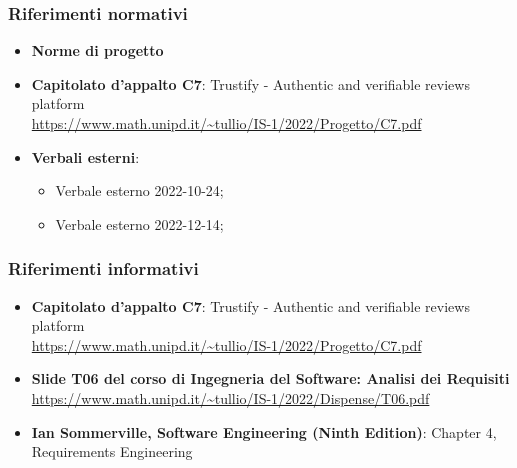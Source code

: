\subsubsection{Riferimenti normativi}
\begin{itemize}
    \item \textbf{Norme di progetto}
    \item \textbf{Capitolato d'appalto C7}: Trustify - Authentic and verifiable reviews platform \\
          \url{https://www.math.unipd.it/~tullio/IS-1/2022/Progetto/C7.pdf}
          \hfill{}
    \item \textbf{Verbali esterni}:
          \begin{itemize}
              \item Verbale esterno 2022-10-24;
              \item Verbale esterno 2022-12-14;
          \end{itemize}
\end{itemize}
\subsubsection{Riferimenti informativi}
\begin{itemize}
    \item \textbf{Capitolato d'appalto C7}: Trustify - Authentic and verifiable reviews platform \\
          \url{https://www.math.unipd.it/~tullio/IS-1/2022/Progetto/C7.pdf}
          \hfill{}
    \item \textbf{Slide T06 del corso di Ingegneria del Software: Analisi dei Requisiti} \\
          \url{https://www.math.unipd.it/~tullio/IS-1/2022/Dispense/T06.pdf}
          \hfill{}
    \item \textbf{Ian Sommerville, Software Engineering (Ninth Edition)}: Chapter 4, Requirements Engineering
\end{itemize}